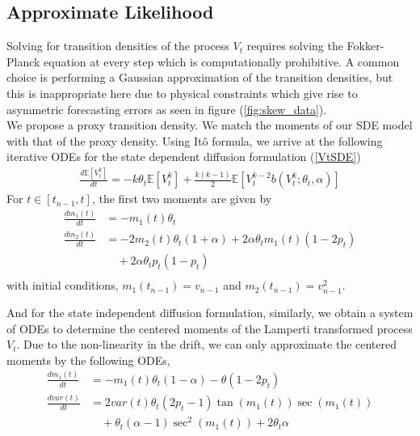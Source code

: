 \documentclass[10pt,twocolumn,letterpaper]{article}
\newcommand{\E}{\mathbb{E}}
\begin{document}
\subsection{Approximate Likelihood}
Solving for transition densities of the process $V_t$ requires solving the Fokker-Planck equation at every step which is computationally prohibitive. A common choice is performing a Gaussian approximation of the transition densities, but this is inappropriate here due to physical constraints which give rise to asymmetric forecasting errors as seen in figure (\ref{fig:skew_data}).\\

We propose a proxy transition density. We match the moments of our SDE model with that of the proxy density. Using It\^o formula, we arrive at the following iterative ODEs for the state dependent diffusion formulation (\ref{VtSDE})
\begin{equation}
\begin{split}
\frac{d \E[ V^k_t]}{dt} = - k \theta_t \E [ V^k_t] + \frac{k(k-1)}{2} \E [ V^{k-2}_t  b(V^k_t;\theta_t, \alpha)]
\end{split}
\end{equation}
For $t\in [t_{n-1}, t]$, the first two moments are given by
\begin{equation}
\begin{split}
\frac{d m_1 (t)}{dt} &= - m_1(t)\theta_t \\
\frac{d m_2 (t)}{dt} &=  -2 m_2(t)\theta_t(1+\alpha) + 2\alpha\theta_t m_1(t)(1-2p_t) \\
&\quad + 2 \alpha\theta_t p_t (1-p_t)\\
\end{split}
\end{equation}
with initial conditions, $m_1(t_{n-1})= v_{n-1}$ and $m_2(t_{n-1})= v_{n-1}^2$.

And for the state independent diffusion formulation, similarly, we  obtain a system of ODEs to determine the centered moments of the Lamperti transformed process $V_t$. Due to the non-linearity in the drift, we can only approximate the centered moments by the following ODEs,
\begin{equation}
\begin{split}
\frac{d m_1 (t)}{dt} &= - m_1(t)\theta_t (1-\alpha) - \theta (1-2 p_t) \\
\frac{d var(t)}{dt} &=  2 var(t) \theta_t (2p_t - 1 ) \tan(m_1 (t)) \sec(m_1 (t))\\
& \quad + \theta_t (\alpha - 1) \sec^2(m_1 (t))  + 2 \theta_t \alpha\\
\end{split}
\end{equation}
\end{document}
